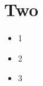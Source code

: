 \documentclass[class=article, crop=false]{standalone}
\begin{document}
\section*{Two}%
\label{sec:Two}

\begin{itemize}
  \item 1
  \item 2
  \item 3
\end{itemize}
\end{document}

